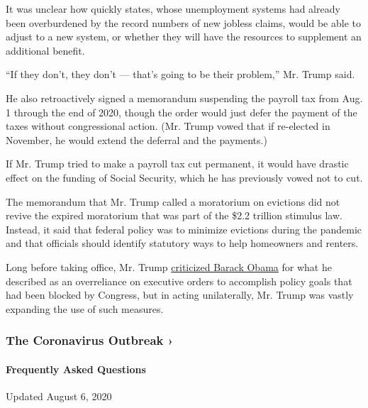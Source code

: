It was unclear how quickly states, whose unemployment systems had
already been overburdened by the record numbers of new jobless claims,
would be able to adjust to a new system, or whether they will have the
resources to supplement an additional benefit.

``If they don't, they don't --- that's going to be their problem,'' Mr.
Trump said.

He also retroactively signed a memorandum suspending the payroll tax
from Aug. 1 through the end of 2020, though the order would just defer
the payment of the taxes without congressional action. (Mr. Trump vowed
that if re-elected in November, he would extend the deferral and the
payments.)

If Mr. Trump tried to make a payroll tax cut permanent, it would have
drastic effect on the funding of Social Security, which he has
previously vowed not to cut.

The memorandum that Mr. Trump called a moratorium on evictions did not
revive the expired moratorium that was part of the \$2.2 trillion
stimulus law. Instead, it said that federal policy was to minimize
evictions during the pandemic and that officials should identify
statutory ways to help homeowners and renters.

Long before taking office, Mr. Trump
\href{https://twitter.com/realdonaldtrump/status/222739756105207808}{criticized
Barack Obama} for what he described as an overreliance on executive
orders to accomplish policy goals that had been blocked by Congress, but
in acting unilaterally, Mr. Trump was vastly expanding the use of such
measures.

\href{https://www.nytimes.com/news-event/coronavirus?action=click\&pgtype=Article\&state=default\&region=MAIN_CONTENT_3\&context=storylines_faq}{}

\hypertarget{the-coronavirus-outbreak-}{%
\subsubsection{The Coronavirus Outbreak
›}\label{the-coronavirus-outbreak-}}

\hypertarget{frequently-asked-questions}{%
\paragraph{Frequently Asked
Questions}\label{frequently-asked-questions}}

Updated August 6, 2020

